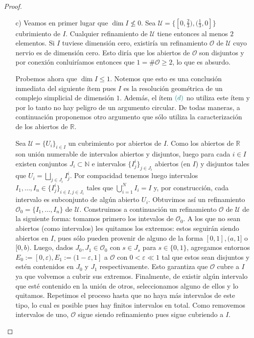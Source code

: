\documentclass[11pt]{article}
\newcommand{\N}{\mathbb{N}}
\newcommand{\R}{\mathbb{R}}
\newcommand{\eps}{\varepsilon}
\newcommand{\paint}[2]{\color{#1}{#2}}
\begin{document}
\begin{proof}
\begin{itemize}
\item[c)] Veamos en primer lugar que $\dim I \not \leq 0$. Sea $\mathcal{U} = \{[0,\frac{2}{3}), (\frac{1}{3},0]\}$ cubrimiento de $I$. Cualquier refinamiento de $\mathcal{U}$ tiene entonces al menos $2$ elementos. Si $I$ tuviese dimensi\'on cero, existir\'ia un refinamiento $\mathcal{O}$ de $\mathcal{U}$ cuyo nervio es de dimensi\'on cero. Esto dir\'ia que los abiertos de $\mathcal{O}$ son disjuntos y por conexi\'on conluir\'iamos entonces que $1 = \#\mathcal{O} \geq 2$, lo que es absurdo. 

Probemos ahora que $\dim I \leq 1$. Notemos que esto es una conclusi\'on inmediata del siguiente \'item pues $I$ es la resoluci\'on geom\'etrica de un complejo simplicial de dimensi\'on $1$. Adem\'as, el \'item $\paint{grey-light-blue}{(d)}$ no utiliza este \'item y por lo tanto no hay peligro de un argumento circular. De todas maneras, a continuaci\'on proponemos otro argumento que s\'olo utiliza la caracterizaci\'on de los abiertos de $\R$. 

Sea $\mathcal{U} = \{U_i\}_{i \in I}$ un cubrimiento por abiertos de $I$. Como los abiertos de $\R$ son uni\'on numerable de intervalos abiertos y disjuntos, luego para cada $i \in I$ existen conjuntos $J_i \subset \N$ e intervalos $\{I^i_j\}_{j \in J_i}$ abiertos (en $I$) y disjuntos tales que $U_i = \bigsqcup_{j \in J_i}I_j^i$. Por compacidad tenemos luego intervalos $I_1, \dots, I_n \in \{I_j^i\}_{i \in I, j \in J_i}$ tales que $\bigcup_{i=1}^N I_i = I$ y, por construcci\'on, cada intervalo es subconjunto de alg\'un abierto $U_i$. Obtuvimos as\'i un refinamiento $\mathcal{O}_0 = \{I_1, \dots, I_n\}$ de $\mathcal{U}$. Construimos a continuaci\'on un refinamiento $\mathcal{O}$ de $\mathcal{U}$ de la siguiente forma: tomamos primero los intevalos de $\mathcal{O}_0$. A los que no sean abiertos (como intervalos) les quitamos los extremos: estos seguir\'an siendo abiertos en $I$, pues s\'olo pueden provenir de alguno de la forma $[0,1], (a,1]$ o $[0,b)$. Luego, dados $J_0,J_1 \in \mathcal{O}_0$ con $s \in J_s$ para $s \in \{0,1\}$, agregamos entornos $E_0 := [0,\eps), E_1 := (1-\eps,1]$ a $\mathcal{O}$ con $0 < \eps \ll 1$ tal que estos sean disjuntos y est\'en contenidos en $J_0$ y $J_1$ respectivamente. Esto garantiza que $\mathcal{O}$ cubre a $I$ ya que volvemos a cubrir sus extremos. Finalmente, de existir alg\'un intervalo que est\'e contenido en la uni\'on de otros, seleccionamos alguno de ellos y lo quitamos. Repetimos el proceso hasta que no haya m\'as intervalos de este tipo, lo cual es posible pues hay finitos intervalos en total. Como removemos intervalos de uno, $\mathcal{O}$ sigue siendo refinamiento pues sigue cubriendo a $I$. 


\end{itemize}
\end{proof}
\end{document}
